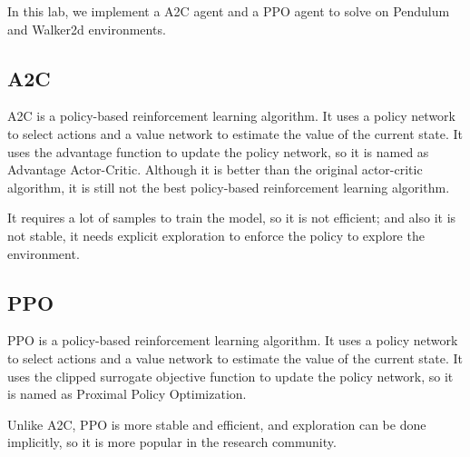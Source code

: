 In this lab, we implement a A2C agent and a PPO agent to solve on Pendulum and Walker2d environments.

\subsection{A2C}
A2C is a policy-based reinforcement learning algorithm. It uses a policy network to select actions and a value network to estimate the value of the current state.
It uses the advantage function to update the policy network, so it is named as Advantage Actor-Critic.
Although it is better than the original actor-critic algorithm, it is still not the best policy-based reinforcement learning algorithm.

It requires a lot of samples to train the model, so it is not efficient; and also it is not stable, it needs explicit exploration to enforce the policy to explore the environment.

\subsection{PPO}
PPO is a policy-based reinforcement learning algorithm. It uses a policy network to select actions and a value network to estimate the value of the current state.
It uses the clipped surrogate objective function to update the policy network, so it is named as Proximal Policy Optimization.

Unlike A2C, PPO is more stable and efficient, and exploration can be done implicitly, so it is more popular in the research community.
